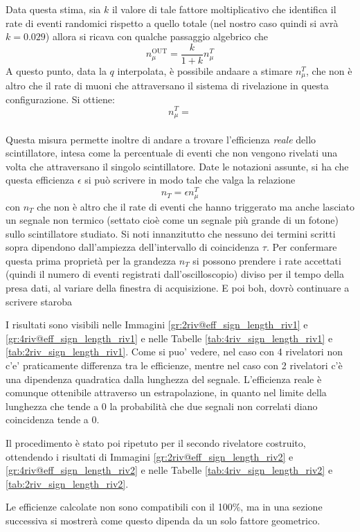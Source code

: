 Data questa stima, sia $k$ il valore di tale fattore moltiplicativo che identifica il rate di eventi randomici rispetto a quello totale (nel nostro caso quindi si avrà $k = 0.029$) allora si ricava con qualche passaggio algebrico che
\begin{equation}
  n_\mu^\text{OUT} = \frac{k}{1+k}n_\mu^T
\end{equation}
A questo punto, data la $q$ interpolata, è possibile andaare a stimare $n_\mu^T$, che non è altro che il rate di muoni che attraversano il sistema di rivelazione in questa configurazione. Si ottiene:
\begin{equation}
  n_\mu^T = 
\end{equation}
\\

Questa misura permette inoltre di andare a trovare l'efficienza \textit{reale} dello scintillatore, intesa come la percentuale di eventi che non vengono rivelati una volta che attraversano il singolo scintillatore. Date le notazioni assunte, si ha che questa efficienza $\epsilon$ si può scrivere in modo tale che valga la relazione
\begin{equation}
  n_T = \epsilon n_\mu^T
\end{equation}
con $n_T$ che non è altro che il rate di eventi che hanno triggerato ma anche lasciato un segnale non termico (settato cioè come un segnale più grande di un fotone) sullo scintillatore studiato. Si noti innanzitutto che nessuno dei termini scritti sopra dipendono dall'ampiezza dell'intervallo di coincidenza $\tau$. Per confermare questa
prima proprietà per la grandezza $n_T$ si possono prendere i rate accettati (quindi il numero di eventi registrati dall'oscilloscopio) diviso per il tempo della presa dati, al variare della finestra di acquisizione. E poi boh, dovrò continuare a scrivere staroba

I risultati sono visibili nelle Immagini \ref{gr:2riv@eff_sign_length_riv1} e \ref{gr:4riv@eff_sign_length_riv1} e nelle Tabelle \ref{tab:4riv_sign_length_riv1} e \ref{tab:2riv_sign_length_riv1}.
Come si puo' vedere, nel caso con 4 rivelatori non c'e' praticamente differenza tra le efficienze, mentre nel caso con 2 rivelatori c'\`e una dipendenza quadratica dalla lunghezza del segnale. L'efficienza reale \`e comunque ottenibile attraverso un estrapolazione, in quanto nel limite della lunghezza che tende a 0 la probabilit\`a che due segnali non correlati diano coincidenza tende a 0.

Il procedimento \`e stato poi ripetuto per il secondo rivelatore costruito, ottendendo i risultati di Immagini \ref{gr:2riv@eff_sign_length_riv2} e \ref{gr:4riv@eff_sign_length_riv2} e nelle Tabelle \ref{tab:4riv_sign_length_riv2} e \ref{tab:2riv_sign_length_riv2}.

Le efficienze calcolate non sono compatibili con il 100\%, ma in una sezione successiva si mostrer\`a come questo dipenda da un solo fattore geometrico.

